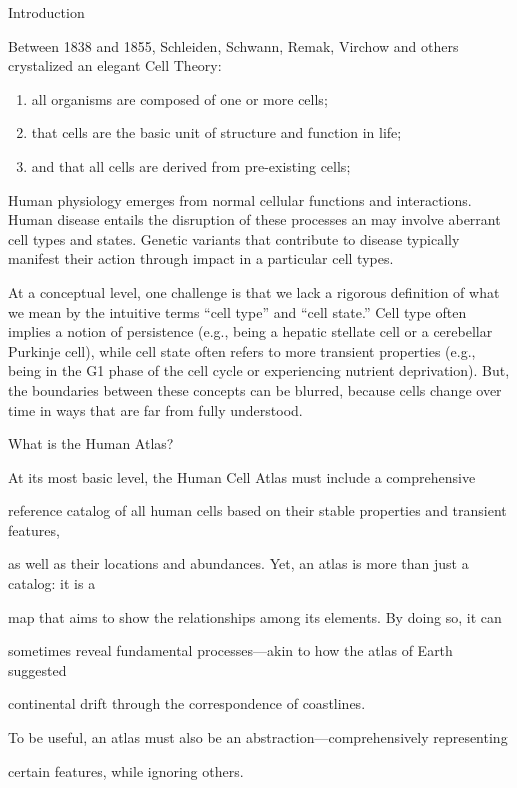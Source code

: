 \documentclass[
]{book}
\begin{document}
Introduction

Between 1838 and 1855, Schleiden, Schwann, Remak, Virchow and others crystalized an elegant Cell Theory:

\begin{enumerate}
\def\labelenumi{\arabic{enumi}.}
\item
  all organisms are composed of one or more cells;
\item
  that cells are the basic unit of structure and function in life;
\item
  and that all cells are derived from pre-existing cells;
\end{enumerate}

Human physiology emerges from normal cellular functions and interactions. Human disease entails the disruption of these processes an may involve aberrant cell types and states. Genetic variants that contribute to disease typically manifest their action through impact in a particular cell types.

At a conceptual level, one challenge is that we lack a rigorous definition of what we mean by the intuitive terms ``cell type'' and ``cell state.'' Cell type often implies a notion of persistence (e.g., being a hepatic stellate cell or a cerebellar Purkinje cell), while cell state often refers to more transient properties (e.g., being in the G1 phase of the cell cycle or experiencing nutrient deprivation). But, the boundaries between these concepts can be blurred, because cells change over time in ways that are far from fully understood.

What is the Human Atlas?

At its most basic level, the Human Cell Atlas must include a comprehensive

reference catalog of all human cells based on their stable properties and transient features,

as well as their locations and abundances. Yet, an atlas is more than just a catalog: it is a

map that aims to show the relationships among its elements. By doing so, it can

sometimes reveal fundamental processes---akin to how the atlas of Earth suggested

continental drift through the correspondence of coastlines.

To be useful, an atlas must also be an abstraction---comprehensively representing

certain features, while ignoring others.
\end{document}
